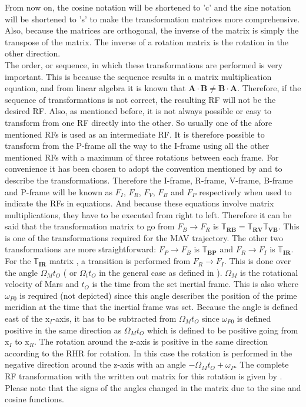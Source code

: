 From now on, the cosine notation will be shortened to 'c' and the sine notation will be shortened to 's' to make the transformation matrices more comprehensive. Also, because the matrices are orthogonal, the inverse of the matrix is simply the transpose of the matrix. The inverse of a rotation matrix is the rotation in the other direction.\\
The order, or sequence, in which these transformations are performed is very important. This is because the sequence results in a matrix multiplication equation, and from linear algebra it is known that $\mathbf{A}\cdot\mathbf{B}\neq\mathbf{B}\cdot\mathbf{A}$. Therefore, if the sequence of transformations is not correct, the resulting \ac{RF} will not be the desired \ac{RF}.  Also, as mentioned before, it is not always possible or easy to transform from one \ac{RF} directly into the other. So usually one of the afore mentioned \ac{RF}s is used as an intermediate \ac{RF}. It is therefore possible to transform from the P-frame all the way to the I-frame using all the other mentioned \ac{RF}s with a maximum of three rotations between each frame. For convenience it has been chosen to adopt the convention mentioned by \cite{mooij2013fd} and \cite{mooij2013stat} to describe the transformations. Therefore the I-frame, R-frame, V-frame, B-frame and P-frame will be known as $F_{I}$, $F_{R}$, $F_{V}$, $F_{B}$ and $F_{P}$ respectively when used to indicate the \ac{RF}s in equations. And because these equations involve matrix multiplications, they have to be executed from right to left. Therefore it can be said that the transformation matrix to go from $F_{B} \rightarrow F_{R}$ is $\mathbb{T}_{\mathbf{RB}}=\mathbb{T}_{\mathbf{RV}}\mathbb{T}_{\mathbf{VB}}$. This is one of the transformations required for the \ac{MAV} trajectory. The other two transformations are more straightforward: $F_{P} \rightarrow F_{B}$ is $\mathbb{T}_{\mathbf{BP}}$ and $F_{R} \rightarrow F_{I}$ is $\mathbb{T}_{\mathbf{IR}}$. For the $\mathbb{T}_{\mathbf{IR}}$ matrix , a transition is performed from $F_{R} \rightarrow F_{I}$. This is done over the angle $\Omega_{M}t_{O}$ ( or $\Omega_{t}t_{O}$ in the general case as defined in ). $\Omega_{M}$ is the rotational velocity of Mars and $t_{O}$ is the time from the set inertial frame. This is also where $\omega_{P0}$ is required (not depicted) since this angle describes the position of the prime meridian at the time that the inertial frame was set. Because the angle is defined east of the x$_{I}$-axis, it has to be subtracted from $\Omega_{M}t_{O}$ since $\omega_{P0}$ is defined positive in the same direction as $\Omega_{M}t_{O}$ which is defined to be positive going from x$_{I}$ to x$_{R}$. The rotation around the z-axis is positive in the same direction according to the \ac{RHR} for rotation. In this case the rotation is performed in the negative direction around the z-axis with an angle $-\Omega_{M}t_{O}+\omega_{P}$. The complete \ac{RF} transformation with the written out matrix for this rotation is given by . Please note that the signs of the angles changed in the matrix due to the sine and cosine functions.

